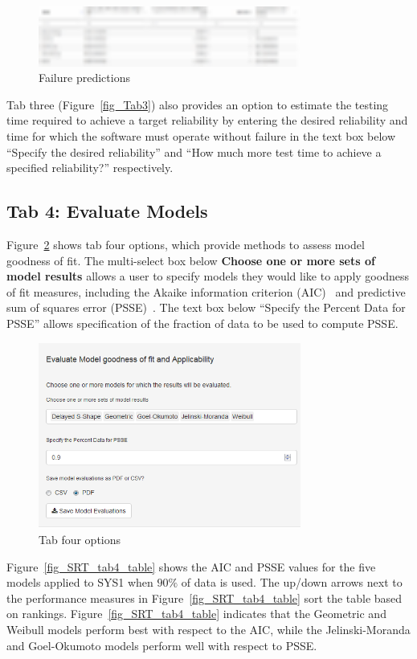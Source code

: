 \documentclass[conference]{IEEEtran}
\begin{document}
\begin{figure}[!h]
\centering
\includegraphics[width=3.4in]{Figures/Tab3-table}
\caption{Failure predictions}
\label{fig_Tab3-table}
\end{figure}


Tab three (Figure~\ref{fig_Tab3}) also provides an option to estimate the testing time required to achieve a target reliability by entering the desired reliability and time for which the software must operate without failure in the text box below ``Specify the desired reliability'' and ``How much more test time to achieve a specified reliability?'' respectively.


\subsection{Tab 4: Evaluate Models}\label{tab4}
Figure~\ref{fig_SRT_tab4} shows tab four options, which provide methods to assess model goodness of fit. The multi-select box below \textbf{Choose one or more sets of model results} allows a user to specify models they would like to apply goodness of fit measures, including the Akaike information criterion (AIC)~\cite{akaike1974new} and predictive sum of squares error (PSSE)~\cite{fiondella2011software}. The text box below ``Specify the Percent Data for PSSE'' allows specification of the fraction of data to be used to compute PSSE.

\begin{figure}[!h]
\centering
\includegraphics[width=3.4in]{Figures/Fig16}
\caption{Tab four options}
\label{fig_SRT_tab4}
\end{figure}

Figure~\ref{fig_SRT_tab4_table} shows the AIC and PSSE values for the five models applied to SYS1 when $90\%$ of data is used. The up/down arrows next to the performance measures in Figure~\ref{fig_SRT_tab4_table} sort the table based on rankings. Figure~\ref{fig_SRT_tab4_table} indicates that the Geometric and Weibull models perform best with respect to the AIC, while the Jelinski-Moranda and Goel-Okumoto models perform well with respect to PSSE.
\end{document}
